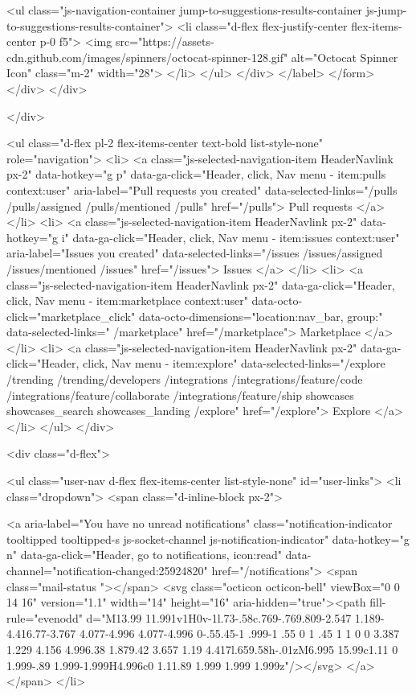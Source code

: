               <ul class="js-navigation-container jump-to-suggestions-results-container js-jump-to-suggestions-results-container">
                <li class="d-flex flex-justify-center flex-items-center p-0 f5">
                  <img src="https://assets-cdn.github.com/images/spinners/octocat-spinner-128.gif" alt="Octocat Spinner Icon" class="m-2" width="28">
                </li>
              </ul>
            </div>
      </label>
</form>  </div>
</div>

            </div>

          <ul class="d-flex pl-2 flex-items-center text-bold list-style-none" role="navigation">
            <li>
              <a class="js-selected-navigation-item HeaderNavlink px-2" data-hotkey="g p" data-ga-click="Header, click, Nav menu - item:pulls context:user" aria-label="Pull requests you created" data-selected-links="/pulls /pulls/assigned /pulls/mentioned /pulls" href="/pulls">
                Pull requests
</a>            </li>
            <li>
              <a class="js-selected-navigation-item HeaderNavlink px-2" data-hotkey="g i" data-ga-click="Header, click, Nav menu - item:issues context:user" aria-label="Issues you created" data-selected-links="/issues /issues/assigned /issues/mentioned /issues" href="/issues">
                Issues
</a>            </li>
                <li>
                  <a class="js-selected-navigation-item HeaderNavlink px-2" data-ga-click="Header, click, Nav menu - item:marketplace context:user" data-octo-click="marketplace_click" data-octo-dimensions="location:nav_bar, group:" data-selected-links=" /marketplace" href="/marketplace">
                    Marketplace
</a>                </li>
            <li>
              <a class="js-selected-navigation-item HeaderNavlink px-2" data-ga-click="Header, click, Nav menu - item:explore" data-selected-links="/explore /trending /trending/developers /integrations /integrations/feature/code /integrations/feature/collaborate /integrations/feature/ship showcases showcases_search showcases_landing /explore" href="/explore">
                Explore
</a>            </li>
          </ul>
      </div>

      <div class="d-flex">
        
<ul class="user-nav d-flex flex-items-center list-style-none" id="user-links">
  <li class="dropdown">
    <span class="d-inline-block  px-2">
      
    <a aria-label="You have no unread notifications" class="notification-indicator tooltipped tooltipped-s  js-socket-channel js-notification-indicator" data-hotkey="g n" data-ga-click="Header, go to notifications, icon:read" data-channel="notification-changed:25924820" href="/notifications">
        <span class="mail-status "></span>
        <svg class="octicon octicon-bell" viewBox="0 0 14 16" version="1.1" width="14" height="16" aria-hidden="true"><path fill-rule="evenodd" d="M13.99 11.991v1H0v-1l.73-.58c.769-.769.809-2.547 1.189-4.416.77-3.767 4.077-4.996 4.077-4.996 0-.55.45-1 .999-1 .55 0 1 .45 1 1 0 0 3.387 1.229 4.156 4.996.38 1.879.42 3.657 1.19 4.417l.659.58h-.01zM6.995 15.99c1.11 0 1.999-.89 1.999-1.999H4.996c0 1.11.89 1.999 1.999 1.999z"/></svg>
</a>
    </span>
  </li>

